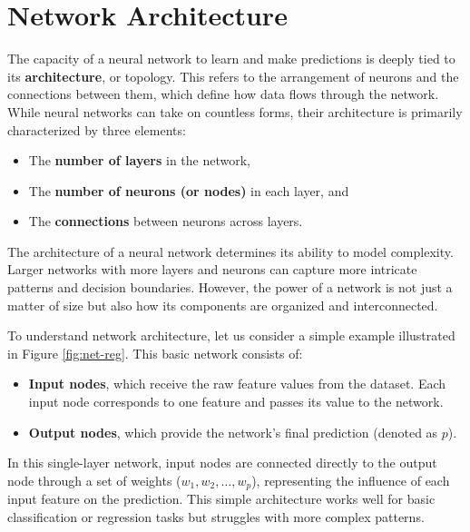 \documentclass[
]{book}
\providecommand{\tightlist}{%
  \setlength{\itemsep}{0pt}\setlength{\parskip}{0pt}}
\theoremstyle{definition}
\theoremstyle{definition}
\theoremstyle{definition}
\theoremstyle{definition}
\theoremstyle{remark}
\begin{document}
\section{Network Architecture}\label{network-architecture}

The capacity of a neural network to learn and make predictions is deeply tied to its \textbf{architecture}, or topology. This refers to the arrangement of neurons and the connections between them, which define how data flows through the network. While neural networks can take on countless forms, their architecture is primarily characterized by three elements:

\begin{itemize}
\tightlist
\item
  The \textbf{number of layers} in the network,\\
\item
  The \textbf{number of neurons (or nodes)} in each layer, and\\
\item
  The \textbf{connections} between neurons across layers.
\end{itemize}

The architecture of a neural network determines its ability to model complexity. Larger networks with more layers and neurons can capture more intricate patterns and decision boundaries. However, the power of a network is not just a matter of size but also how its components are organized and interconnected.

To understand network architecture, let us consider a simple example illustrated in Figure \ref{fig:net-reg}. This basic network consists of:

\begin{itemize}
\tightlist
\item
  \textbf{Input nodes}, which receive the raw feature values from the dataset. Each input node corresponds to one feature and passes its value to the network.\\
\item
  \textbf{Output nodes}, which provide the network's final prediction (denoted as \(p\)).
\end{itemize}

In this single-layer network, input nodes are connected directly to the output node through a set of weights (\(w_1, w_2, \dots, w_p\)), representing the influence of each input feature on the prediction. This simple architecture works well for basic classification or regression tasks but struggles with more complex patterns.
\end{document}
